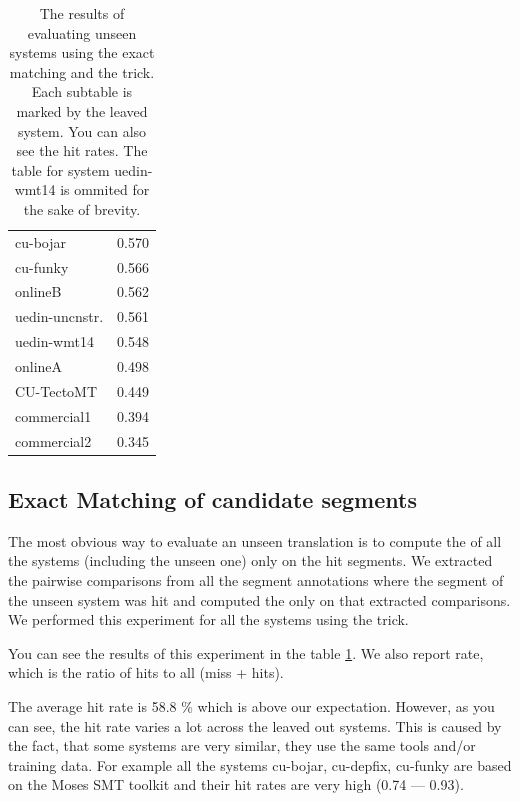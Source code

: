 \begin{table}
{\begin{tabular}{|l|c|}
           cu-bojar            &   0.570 \\
           cu-funky            &   0.566 \\
           onlineB                &   0.562 \\
           uedin-uncnstr. &   0.561 \\
           uedin-wmt14         &   0.548 \\
           onlineA                &   0.498 \\
           CU-TectoMT          &   0.449 \\
           commercial1         &   0.394 \\
           commercial2         &   0.345 \\
          \hline
         \end{tabular}
      \label{}
    }

    \caption[Results of evaluating unseen systems by exact matching]{The
      results of evaluating unseen systems using the exact matching and the
       trick. Each subtable is marked by the leaved
      system.  You can also see the hit rates. The table for system uedin-wmt14
      is ommited for the sake of brevity.}

  \label{one-out-results}
\end{table}

\subsection{Exact Matching of candidate segments}

The most obvious way to evaluate an unseen translation is to compute the
 of all the systems (including the unseen
one) only on the hit segments. We extracted the pairwise comparisons from all
the segment annotations where the segment of the unseen system was hit and
computed the  only on that extracted
comparisons. We performed this experiment for all the systems using the
 trick.

You can see the results of this experiment in the table \ref{one-out-results}.
We also report  rate, which is the ratio of hits to all (miss +
hits).

The average hit rate is 58.8 \% which is above our expectation. However, as you
can see, the hit rate varies a lot across the leaved out systems. This is
caused by the fact, that some systems are very similar, they use the same tools
and/or training data. For example all the systems cu-bojar, cu-depfix, cu-funky
are based on the Moses SMT toolkit and their hit rates are very high (0.74 ---
0.93).

